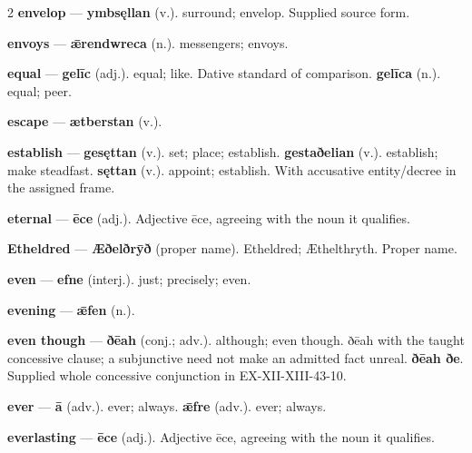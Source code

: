 \begin{multicols}{2}
\textbf{envelop} — \textbf{ymbsęllan} (v.). surround; envelop. Supplied source form.\par
\textbf{envoys} — \textbf{ǣrendwreca} (n.). messengers; envoys.\par
\textbf{equal} — \textbf{gelīc} (adj.). equal; like. Dative standard of comparison. \textbf{gelīca} (n.). equal; peer.\par
\textbf{escape} — \textbf{ætberstan} (v.).\par
\textbf{establish} — \textbf{gesęttan} (v.). set; place; establish. \textbf{gestaðelian} (v.). establish; make steadfast. \textbf{sęttan} (v.). appoint; establish. With accusative entity/decree in the assigned frame.\par
\textbf{eternal} — \textbf{ēce} (adj.). Adjective ēce, agreeing with the noun it qualifies.\par
\textbf{Etheldred} — \textbf{Æðelðrȳð} (proper name). Etheldred; Æthelthryth. Proper name.\par
\textbf{even} — \textbf{efne} (interj.). just; precisely; even.\par
\textbf{evening} — \textbf{ǣfen} (n.).\par
\textbf{even though} — \textbf{ðēah} (conj.; adv.). although; even though. ðēah with the taught concessive clause; a subjunctive need not make an admitted fact unreal. \textbf{ðēah ðe}. Supplied whole concessive conjunction in EX-XII-XIII-43-10.\par
\textbf{ever} — \textbf{ā} (adv.). ever; always. \textbf{ǣfre} (adv.). ever; always.\par
\textbf{everlasting} — \textbf{ēce} (adj.). Adjective ēce, agreeing with the noun it qualifies.\par

\end{multicols}
